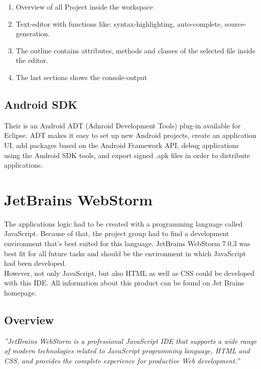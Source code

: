 \begin{enumerate}
\item Overview of all Project inside the workspace
\item Text-editor with functions like: syntax-highlighting, auto-complete, source-generation.
\item The outline contains attributes, methods and classes of the selected file inside the editor. 
\item The last sections shows the console-output     
\end{enumerate}
\newpage
\subsection{Android SDK}
Their is an Android ADT (Adnroid Development Tools) plug-in available for Eclipse. ADT makes it easy to set up new Android projects, create an application UI, add packages based on the Android Framework API, debug applications using the Android SDK tools, and export signed .apk files in order to distribute  applications.














\section{JetBrains WebStorm}
The applications logic had to be created with a programming language called JavaScript. Because of that, the project group had to find a development environment that's best suited for this language. JetBrains WebStorm 7.0.3 was best fit for all future tasks and should be the environment in which JavaScript had been developed. 
\\

However, not only JavaScript, but also HTML as well as CSS could be developed with this IDE. All information about this product can be found on Jet Brains homepage.\cite{webstorm}
\subsection{Overview}
\textit{''JetBrains WebStorm is a professional JavaScript IDE that supports a wide range of modern technologies related to JavaScript programming language, HTML and  CSS, and provides the complete experience for productive Web development.''}\cite{webstorm}
\\

